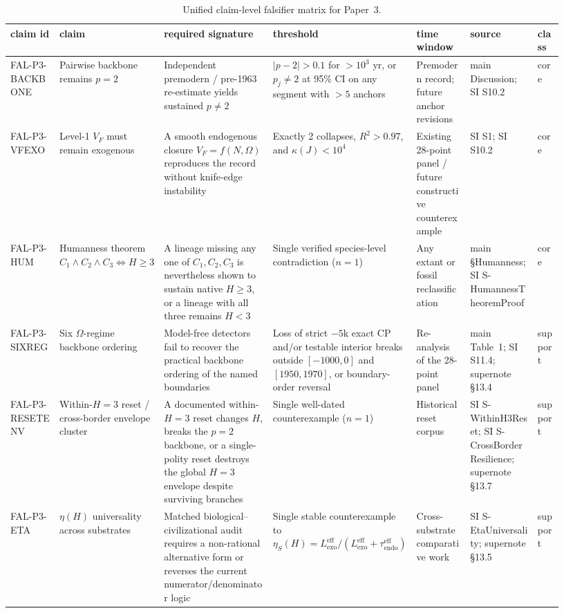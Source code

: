 \documentclass[11pt]{article}
\begin{document}
\begin{table}[t]
\centering
\scriptsize
\caption{Unified claim-level falsifier matrix for Paper~3.}
\label{tab:S-Falsifier-matrix}
\begin{tabular}{p{0.10\linewidth}p{0.14\linewidth}p{0.21\linewidth}%
                p{0.18\linewidth}p{0.11\linewidth}p{0.14\linewidth}p{0.05\linewidth}}
\toprule
claim id & claim & required signature & threshold & time window & source & class \\
\midrule
FAL-P3-BACKBONE & Pairwise backbone remains $p=2$ & Independent premodern / pre-1963 re-estimate yields sustained $p\neq 2$ & $|p-2|>0.1$ for $>10^3$ yr, or $p_j\neq 2$ at 95\% CI on any segment with $>5$ anchors & Premodern record; future anchor revisions & main Discussion; SI S10.2 & core \\
FAL-P3-VFEXO & Level-1 $V_F$ must remain exogenous & A smooth endogenous closure $V_F=f(N,\Omega)$ reproduces the record without knife-edge instability & Exactly 2 collapses, $R^2>0.97$, and $\kappa(J)<10^4$ & Existing 28-point panel / future constructive counterexample & SI S1; SI S10.2 & core \\
FAL-P3-HUM & Humanness theorem $C_1\wedge C_2\wedge C_3 \Leftrightarrow H\ge 3$ & A lineage missing any one of $C_1,C_2,C_3$ is nevertheless shown to sustain native $H\ge 3$, or a lineage with all three remains $H<3$ & Single verified species-level contradiction ($n=1$) & Any extant or fossil reclassification & main \S Humanness; SI S-HumannessTheoremProof & core \\
FAL-P3-SIXREG & Six $\Omega$-regime backbone ordering & Model-free detectors fail to recover the practical backbone ordering of the named boundaries & Loss of strict $-5$k exact CP and/or testable interior breaks outside $[-1000,0]$ and $[1950,1970]$, or boundary-order reversal & Re-analysis of the 28-point panel & main Table~1; SI S11.4; supernote \S13.4 & support \\
FAL-P3-RESETENV & Within-$H{=}3$ reset / cross-border envelope cluster & A documented within-$H{=}3$ reset changes $H$, breaks the $p=2$ backbone, or a single-polity reset destroys the global $H{=}3$ envelope despite surviving branches & Single well-dated counterexample ($n=1$) & Historical reset corpus & SI S-WithinH3Reset; SI S-CrossBorderResilience; supernote \S13.7 & support \\
FAL-P3-ETA & $\eta(H)$ universality across substrates & Matched biological--civilizational audit requires a non-rational alternative form or reverses the current numerator/denominator logic & Single stable counterexample to $\eta_S(H)=L_{\mathrm{exo}}^{\mathrm{eff}}/(L_{\mathrm{exo}}^{\mathrm{eff}}+\tau_{\mathrm{endo}}^{\mathrm{eff}})$ & Cross-substrate comparative work & SI S-EtaUniversality; supernote \S13.5 & support \\

\end{tabular}
\end{table}
\end{document}
